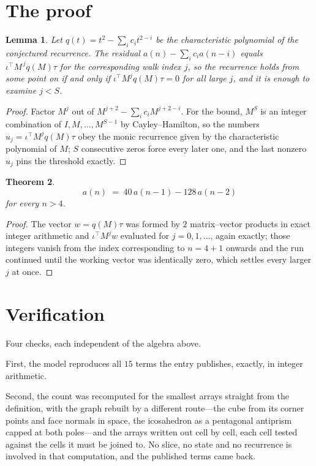 \documentclass[11pt,a4paper]{article}
\theoremstyle{plain}
\newtheorem{theorem}{Theorem}
\newtheorem{lemma}[theorem]{Lemma}
\theoremstyle{definition}
\begin{document}
\section{The proof}

\begin{lemma}\label{lem:crit}
Let $q(t)=t^{2}-\sum_i c_it^{2-i}$ be the characteristic polynomial of the
conjectured recurrence. The residual $a(n)-\sum_ic_ia(n-i)$ equals
$\iota^{\!\top}M^{\,j}q(M)\tau$ for the corresponding walk index $j$, so the recurrence
holds from some point on if and only if $\iota^{\!\top}M^{j}q(M)\tau=0$ for all large $j$,
and it is enough to examine $j<S$.
\end{lemma}

\begin{proof}
Factor $M^{j}$ out of $M^{j+2}-\sum_ic_iM^{j+2-i}$. For the bound, $M^{S}$
is an integer combination of $I,M,\dots,M^{S-1}$ by Cayley--Hamilton, so the numbers
$u_j=\iota^{\!\top}M^{j}q(M)\tau$ obey the monic recurrence given by the characteristic
polynomial of $M$; $S$ consecutive zeros force every later one, and the last nonzero $u_j$
pins the threshold exactly.
\end{proof}

\begin{theorem}
\[
a(n)\;=\;40\,a(n-1) - 128\,a(n-2)
\]
for every $n>4$.
\end{theorem}

\begin{proof}
The vector $w=q(M)\tau$ was formed by $2$ matrix--vector products in exact integer
arithmetic and $\iota^{\!\top}M^{j}w$ evaluated for $j=0,1,\dots$, again exactly; those
integers vanish from the index corresponding to $n=4+1$ onwards and the run continued
until the working vector was identically zero, which settles every larger $j$ at once.
\end{proof}

\section{Verification}

Four checks, each independent of the algebra above.

First, the model reproduces all $15$ terms the entry publishes, exactly, in integer
arithmetic.

Second, the count was recomputed for the smallest arrays straight from the definition, with the
graph rebuilt by a different route---the cube from its corner points and face normals in space,
the icosahedron as a pentagonal antiprism capped at both poles---and the arrays written out cell
by cell, each cell tested against the cells it must be joined to. No slice, no state and no
recurrence is involved in that computation, and the published terms came back.
\end{document}
